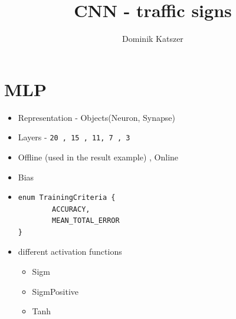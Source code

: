 \documentclass[]{report}
\title{CNN - traffic signs}
\author{Dominik Katszer}
\begin{document}
\maketitle
\section{MLP}
\begin{itemize}
\item Representation - Objects(Neuron, Synapse)
\item Layers - \verb!20 , 15 , 11, 7 , 3!
\item Offline (used in the result example) , Online
\item Bias
\item \begin{verbatim}
enum TrainingCriteria {
        ACCURACY,
        MEAN_TOTAL_ERROR
}
\end{verbatim}
\item different activation functions 
\begin{itemize}
\item Sigm
\item SigmPositive
\item Tanh
\end{itemize}
\end{itemize}
\end{document}
